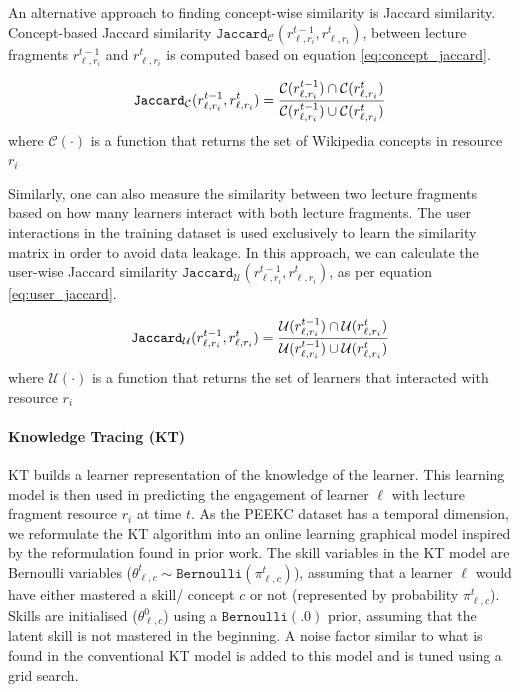 \documentclass[letterpaper]{article} %
\begin{document}
An alternative approach to finding concept-wise similarity is Jaccard similarity. Concept-based Jaccard similarity $\texttt{Jaccard}_{\mathcal{C}}(r^{t-1}_{\ell,r_i}, r^{t}_{\ell,r_i})$,  between lecture fragments $r^{t-1}_{\ell,r_i}$ and $r^{t}_{\ell,r_i}$ is computed based on equation \ref{eq:concept_jaccard}.

\begin{equation} \label{eq:concept_jaccard}\centering 
    \texttt{Jaccard}_{\mathcal{C}}(r^{t-1}_{\ell,r_i}, r^{t}_{\ell,r_i}) = 
    \frac{\mathcal{C}(r^{t-1}_{\ell,r_i}) \cap \mathcal{C}(r^{t}_{\ell,r_i})}
    {\mathcal{C}(r^{t-1}_{\ell,r_i}) \cup \mathcal{C}(r^{t}_{\ell,r_i})}
\end{equation}  
where $\mathcal{C}(\cdot)$ is a function that returns the set of Wikipedia concepts in resource $r_i$

Similarly, one can also measure the similarity between two lecture fragments based on how many learners interact with both lecture fragments. The user interactions in the training dataset is used exclusively to learn the similarity matrix in order to avoid data leakage. In this approach, we can calculate the user-wise Jaccard similarity $\texttt{Jaccard}_\mathcal{U}(r^{t-1}_{\ell,r_i}, r^{t}_{\ell,r_i})$, as per equation \ref{eq:user_jaccard}. 

\begin{equation} \label{eq:user_jaccard}\centering 
    \texttt{Jaccard}_\mathcal{U}(r^{t-1}_{\ell,r_i}, r^{t}_{\ell,r_i}) = 
    \frac{\mathcal{U}(r^{t-1}_{\ell,r_i}) \cap \mathcal{U}(r^{t}_{\ell,r_i})}
    {\mathcal{U}(r^{t-1}_{\ell,r_i}) \cup \mathcal{U}(r^{t}_{\ell,r_i})}
\end{equation}  
where $\mathcal{U}(\cdot)$ is a function that returns the set of learners that interacted with resource $r_i$

\paragraph{Knowledge Tracing (KT)}  

KT builds a learner representation of the knowledge of the learner. This learning model is then used in predicting the engagement of learner $\ell$ with lecture fragment resource $r_i$ at time $t$. As the PEEKC dataset has a temporal dimension, we reformulate the KT algorithm into an online learning graphical model inspired by the reformulation found in prior work.  The skill variables in the KT model are Bernoulli variables ($\theta^t_{\ell,c} \sim \texttt{Bernoulli}(\pi^t_{\ell,c})$), assuming that a learner $\ell$ would have either mastered a skill/ concept $c$ or not (represented by probability $\pi^t_{\ell,c}$). Skills are initialised ($\theta^0_{\ell,c}$) using a $\texttt{Bernoulli}(.0)$ prior, assuming that the latent skill is not mastered in the beginning. A noise factor similar to what is found in the conventional KT model is added to this model and is tuned using a grid search.
\end{document}
